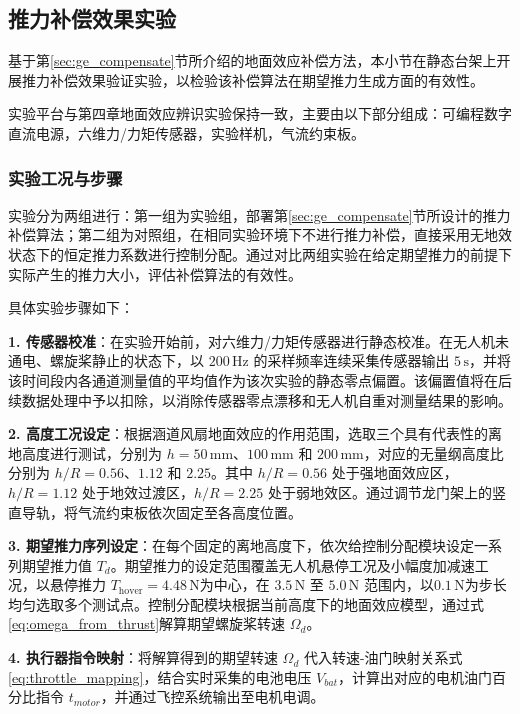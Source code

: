 \subsection{推力补偿效果实验}
\label{sec:thrust_experiment}
基于第\ref{sec:ge_compensate}节所介绍的地面效应补偿方法，本小节在静态台架上开展推力补偿效果验证实验，以检验该补偿算法在期望推力生成方面的有效性。

实验平台与第四章地面效应辨识实验保持一致，主要由以下部分组成：可编程数字直流电源，六维力/力矩传感器，实验样机，气流约束板。

\subsubsection{实验工况与步骤}

实验分为两组进行：第一组为实验组，部署第\ref{sec:ge_compensate}节所设计的推力补偿算法；第二组为对照组，在相同实验环境下不进行推力补偿，直接采用无地效状态下的恒定推力系数进行控制分配。通过对比两组实验在给定期望推力的前提下实际产生的推力大小，评估补偿算法的有效性。

具体实验步骤如下：

\textbf{1. 传感器校准}：在实验开始前，对六维力/力矩传感器进行静态校准。在无人机未通电、螺旋桨静止的状态下，以 \(200\,\mathrm{Hz}\) 的采样频率连续采集传感器输出 \(5\,\mathrm{s}\)，并将该时间段内各通道测量值的平均值作为该次实验的静态零点偏置。该偏置值将在后续数据处理中予以扣除，以消除传感器零点漂移和无人机自重对测量结果的影响。
    
\textbf{2. 高度工况设定}：根据涵道风扇地面效应的作用范围，选取三个具有代表性的离地高度进行测试，分别为 \(h = 50\,\mathrm{mm}\)、\(100\,\mathrm{mm}\) 和 \(200\,\mathrm{mm}\)，对应的无量纲高度比分别为 \(h/R = 0.56\)、\(1.12\) 和 \(2.25\)。其中 \(h/R = 0.56\) 处于强地面效应区，\(h/R = 1.12\) 处于地效过渡区，\(h/R = 2.25\) 处于弱地效区。通过调节龙门架上的竖直导轨，将气流约束板依次固定至各高度位置。
    
\textbf{3. 期望推力序列设定}：在每个固定的离地高度下，依次给控制分配模块设定一系列期望推力值 \(T_d\)。期望推力的设定范围覆盖无人机悬停工况及小幅度加减速工况，以悬停推力 \(T_{\mathrm{hover}} = 4.48\,\mathrm{N}\)为中心，在 \(3.5\,\mathrm{N}\) 至 \(5.0\,\mathrm{N}\) 范围内，以\(0.1\,\mathrm{N}\)为步长均匀选取多个测试点。控制分配模块根据当前高度下的地面效应模型，通过式\eqref{eq:omega_from_thrust}解算期望螺旋桨转速 \(\Omega_d\)。
    
\textbf{4. 执行器指令映射}：将解算得到的期望转速 \(\Omega_d\) 代入转速-油门映射关系式\eqref{eq:throttle_mapping}，结合实时采集的电池电压 \(V_{bat}\)，计算出对应的电机油门百分比指令 \(t_{motor}\)，并通过飞控系统输出至电机电调。
    
